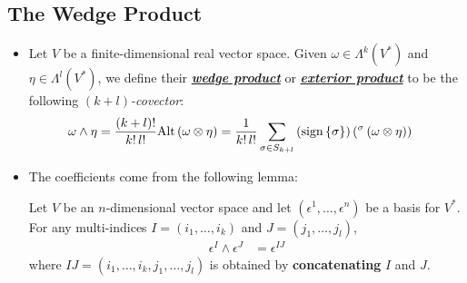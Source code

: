 \documentclass[11pt]{article}
\begin{document}
\subsection{The Wedge Product}
\begin{itemize}
\item \begin{definition}
Let $V$ be a finite-dimensional real vector space. Given $\omega \in \Lambda^k(V^{*})$ and $\eta \in \Lambda^l(V^{*})$, we define their \underline{\emph{\textbf{wedge product}}} or \underline{\emph{\textbf{exterior product}}} to be the following \emph{$(k+ l)$-covector}:
\begin{align}
\omega \wedge \eta &= \frac{(k+l)!}{k! \,l!}\text{Alt}\left(\omega \otimes \eta \right) =   \frac{1}{k! \,l!}\sum_{\sigma \in S_{k+l}} \left(\text{sign}\left\{\sigma\right\}\right)\left(^{\sigma}\left(\omega \otimes \eta \right)\right)  \label{eqn: wedge_product}
\end{align}
\end{definition}

\item The coefficients come from the following lemma:
\begin{lemma}
Let $V$ be an $n$-dimensional vector space and let $(\epsilon^1,\ldots, \epsilon^n)$ be a basis for $V^{*}$. For any multi-indices $I=(i_1,\ldots, i_k)$ and $J=(j_1,\ldots, j_l)$,
\begin{align}
\epsilon^{I} \wedge \epsilon^{J} &= \epsilon^{IJ} \label{eqn: wedge_product_of_basis}
\end{align}
where $IJ= (i_1,\ldots, i_k, j_1,\ldots, j_l)$ is obtained by \textbf{concatenating} $I$ and $J$.
\end{lemma}


\end{itemize}
\end{document}
